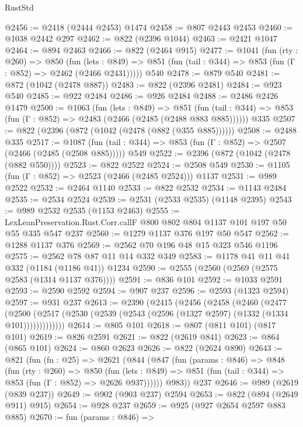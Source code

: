 \begin{lexlean}{RustStd}
\begin{coremodule}
@2456 := @2418 (@2444 @2453) @1474
@2458 := @807 @2443 @2453
@2460 := @1038 @2442 @297
@2462 := @822 (@2396 @1044)
@2463 := @2421 @1047
@2464 := @894 @2463
@2466 := @822 (@2464 @915)
@2477 := @1041
    (fun (rty : @260) =>
    @850
      (fun (lets : @849) =>
      @851 (fun (tail : @344) => @853 (fun (Γ : @852) => @2462 (@2466 @2431)))))
    @540
@2478 := @879 @540
@2481 := @872 (@1042 (@2478 @887))
@2483 := @822 (@2396 @2481)
@2484 := @923 @540
@2485 := @922 @2484
@2486 := @926 @2484
@2488 := @2486 @2426 @1479
@2500 := @1063
    (fun (lets : @849) =>
    @851 (fun (tail : @344) => @853 (fun (Γ : @852) => @2483 (@2466 (@2485 (@2488 @883 @885))))))
    @335
@2507 := @822 (@2396 (@872 (@1042 (@2478 (@882 (@355 @885))))))
@2508 := @2488 @335
@2517 := @1087
    (fun (tail : @344) => @853 (fun (Γ : @852) => @2507 (@2466 (@2485 (@2508 @885)))))
    @549
@2522 := @2396 (@872 (@1042 (@2478 (@882 @550))))
@2523 := @822 @2522
@2524 := @2508 @549
@2530 := @1105 (fun (Γ : @852) => @2523 (@2466 (@2485 @2524))) @1137
@2531 := @989 @2522
@2532 := @2464 @1140
@2533 := @822 @2532
@2534 := @1143 @2484
@2535 := @2534 @2524
@2539 := @2531 (@2533 @2535) (@1148 @2395)
@2543 := @989 @2532 @2535 (@1153 @2463)
@2555 := LexLeanPreservation.Rust.Corr.callF @800 @802 @804 @1137 @101 @197 @50 @55 @335 @547 @237
@2560 := @1279 @1137 @376 @197 @50 @547
@2562 := @1288 @1137 @376
@2569 := @2562 @70 @196 @48 @15 @323 @546 @1196
@2575 := @2562 @78 @87 @11 @14 @332 @349
@2583 := @1178 @41 @11 @41 @332 (@1184 (@1186 @41)) @1234
@2590 := @2555 (@2560 (@2569 (@2575 @2583 (@1314 @1137 @376))))
@2591 := @836 @101
@2592 := @1033 @2591
@2593 := @2590 @2592
@2594 := @907 @237
@2596 := @2593 (@1323 @2594)
@2597 := @931 @237
@2613 := @2390
    (@2415
      (@2456
        (@2458
          (@2460
            (@2477
              (@2500
                (@2517 (@2530 (@2539 (@2543 (@2596 (@1327 @2597) (@1332 (@1334 @101)))))))))))))
@2614 := @805 @101
@2618 := @807 (@811 @101) (@817 @101)
@2619 := @826 @2591
@2621 := @822 (@2619 @841)
@2623 := @864 (@865 @101)
@2624 := @860 @2623
@2626 := @822 (@2624 @890)
@2643 := @821
    (fun (fn : @25) =>
    @2621
      (@844
        (@847
          (fun (params : @846) =>
          @848
            (fun (rty : @260) =>
            @850
              (fun (lets : @849) =>
              @851 (fun (tail : @344) => @853 (fun (Γ : @852) => @2626 @937))))))
        @983))
    @237
@2646 := @989 (@2619 (@839 @237))
@2649 := @902 (@903 @237) @2594
@2653 := @822 (@894 (@2649 @911) @915)
@2654 := @928 @237
@2659 := @925 (@927 @2654 @2597 @883 @885)
@2670 := fun (params : @846) =>

\end{coremodule}
\end{lexlean}
